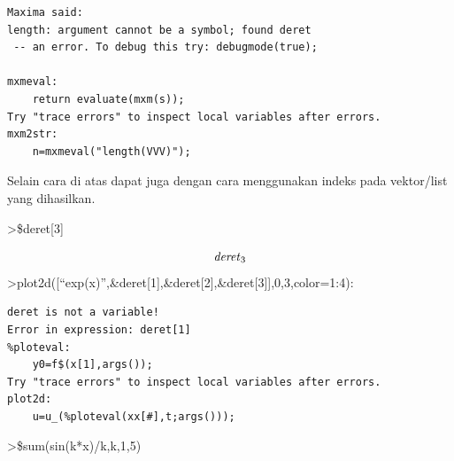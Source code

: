 \documentclass[
]{book}
\begin{document}
\begin{verbatim}
Maxima said:
length: argument cannot be a symbol; found deret
 -- an error. To debug this try: debugmode(true);

mxmeval:
    return evaluate(mxm(s));
Try "trace errors" to inspect local variables after errors.
mxm2str:
    n=mxmeval("length(VVV)");
\end{verbatim}

Selain cara di atas dapat juga dengan cara menggunakan indeks pada vektor/list yang dihasilkan.

\textgreater\$deret{[}3{]}

\[{\it deret}_{3}\]\textgreater plot2d({[}``exp(x)'',\&deret{[}1{]},\&deret{[}2{]},\&deret{[}3{]}{]},0,3,color=1:4):

\begin{verbatim}
deret is not a variable!
Error in expression: deret[1]
%ploteval:
    y0=f$(x[1],args());
Try "trace errors" to inspect local variables after errors.
plot2d:
    u=u_(%ploteval(xx[#],t;args()));
\end{verbatim}

\textgreater\$sum(sin(k*x)/k,k,1,5)
\end{document}
